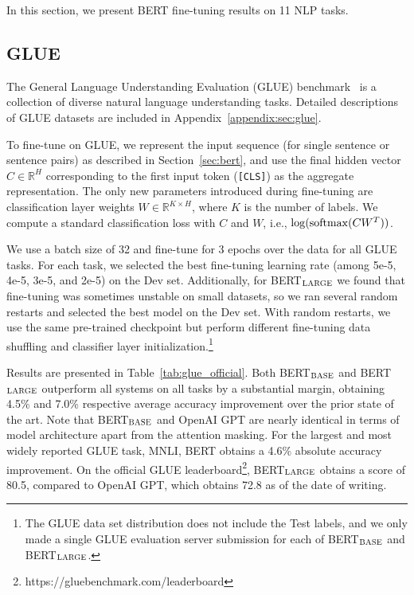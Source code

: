 \documentclass[11pt,a4paper]{article}
\newcommand\bertbase{BERT$_{\small \textsc{BASE}}$\xspace}
\newcommand\bertlarge{BERT$_{\small \textsc{LARGE}}$\xspace}
\begin{document}
In this section, we present BERT fine-tuning results on 11 NLP tasks. 

\subsection{GLUE}
\label{sec:glue}

The General Language Understanding Evaluation (GLUE) benchmark~\cite{wang-etal:2018:_glue} is a collection of diverse natural language understanding tasks.
Detailed descriptions of GLUE datasets are included in Appendix~\ref{appendix:sec:glue}.

To fine-tune on GLUE, we represent the input sequence (for single sentence or sentence pairs) as described in Section~\ref{sec:bert}, and use the final hidden vector $C \in \mathbb{R}^{H}$ corresponding to the first input token ({\tt [CLS]}) as the aggregate representation.
The only new parameters introduced during fine-tuning are  classification layer weights $W \in \mathbb{R}^{K \times H}$, where $K$ is the number of labels. We compute a standard classification loss with $C$ and $W$, i.e., $\log({\rm softmax}(CW^T))$.

We use a batch size of 32 and fine-tune for 3 epochs over the data for all GLUE tasks. For each task, we selected the best fine-tuning learning rate (among 5e-5, 4e-5, 3e-5, and 2e-5) on the Dev set. Additionally, for \bertlarge we found that fine-tuning was sometimes unstable on small datasets, so we ran several random restarts and selected the best model on the Dev set. With random restarts, we use the same pre-trained checkpoint but perform different fine-tuning data shuffling and classifier layer initialization.\footnote{The GLUE data set distribution does not include the Test labels, and we only made a single GLUE evaluation server submission for each of \bertbase and \bertlarge.}

Results are presented in Table~\ref{tab:glue_official}. Both \bertbase and \bertlarge outperform all systems on all tasks by a substantial margin, obtaining 4.5\% and 7.0\% respective average accuracy improvement over the prior state of the art. Note that \bertbase and OpenAI GPT are nearly identical in terms of model architecture apart from the attention masking. For the largest and most widely reported GLUE task, MNLI, BERT obtains a 4.6\% absolute accuracy improvement. On the official GLUE leaderboard\footnote{https://gluebenchmark.com/leaderboard},
\bertlarge obtains a score of 80.5, compared to OpenAI GPT, which obtains 72.8 as of the date of writing.
\end{document}

